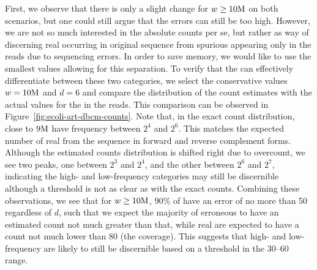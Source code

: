 First, we observe that there is only a slight change for $w\geq 10\mega$ on both scenarios, but one could still argue that the errors can still be too high. However, we are not so much interested in the absolute counts per se, but rather as way of discerning real \kmers occurring in original sequence from spurious \kmers appearing only in the reads due to sequencing errors. In order to save memory, we would like to use the smallest values allowing for this separation.
To verify that the \dBCM can effectively differentiate between these two categories, we select the conservative values $w=10\mega$ and $d=6$ and compare the distribution of the count estimates with the actual values for the  in the reads. This comparison can be observed in Figure~\ref{fig:ecoli-art-dbcm-counts}. Note that, in the exact count distribution, close to $9\mega$  have frequency between $2^4$ and $2^6$. This matches the expected number of real  from the sequence in forward and reverse complement forms. Although the estimated counts distribution is shifted right due to overcount, we see two peaks, one between $2^3$ and $2^4$, and the other between $2^6$ and $2^7$, indicating the high- and low-frequency categories may still be discernible although a threshold is not as clear as with the exact counts.
Combining these observations, we see that for $w \geq 10\mega$, $90\%$ of  have an error of no more than 50 regardless of $d$, such that we expect the majority of erroneous  to have an estimated count not much greater than that, while real  are expected to have a count not much lower than $80$ (the coverage). This suggests that high- and low-frequency  are likely to still be discernible based on a threshold in the 30--60 range.


